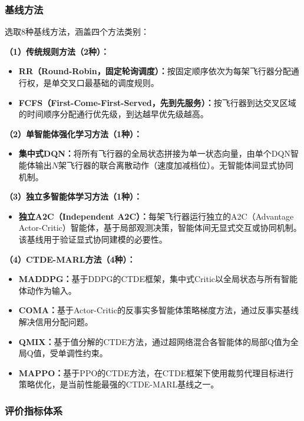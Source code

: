 \documentclass[12pt,a4paper,UTF8]{ctexart}
\begin{document}
\subsubsection{基线方法}

选取8种基线方法，涵盖四个方法类别：

\textbf{（1）传统规则方法（2种）：}
\begin{itemize}
    \item \textbf{RR（Round-Robin，固定轮询调度）：}按固定顺序依次为每架飞行器分配通行权，是单交叉口最基础的调度规则。
    \item \textbf{FCFS（First-Come-First-Served，先到先服务）：}按飞行器到达交叉区域的时间顺序分配通行优先级，到达越早优先级越高。
\end{itemize}

\textbf{（2）单智能体强化学习方法（1种）：}
\begin{itemize}
    \item \textbf{集中式DQN：}将所有飞行器的全局状态拼接为单一状态向量，由单个DQN智能体输出$N$架飞行器的联合离散动作（速度加减档位）。无智能体间显式协同机制。
\end{itemize}

\textbf{（3）独立多智能体学习方法（1种）：}
\begin{itemize}
    \item \textbf{独立A2C（Independent A2C）：}每架飞行器运行独立的A2C（Advantage Actor-Critic）智能体，基于局部观测决策，智能体间无显式交互或协同机制。该基线用于验证显式协同建模的必要性。
\end{itemize}

\textbf{（4）CTDE-MARL方法（4种）：}
\begin{itemize}
    \item \textbf{MADDPG：}基于DDPG的CTDE框架，集中式Critic以全局状态与所有智能体动作为输入。
    \item \textbf{COMA：}基于Actor-Critic的反事实多智能体策略梯度方法，通过反事实基线解决信用分配问题。
    \item \textbf{QMIX：}基于值分解的CTDE方法，通过超网络混合各智能体的局部Q值为全局Q值，受单调性约束。
    \item \textbf{MAPPO：}基于PPO的CTDE方法，在CTDE框架下使用裁剪代理目标进行策略优化，是当前性能最强的CTDE-MARL基线之一。
\end{itemize}

\subsubsection{评价指标体系}
\end{document}
